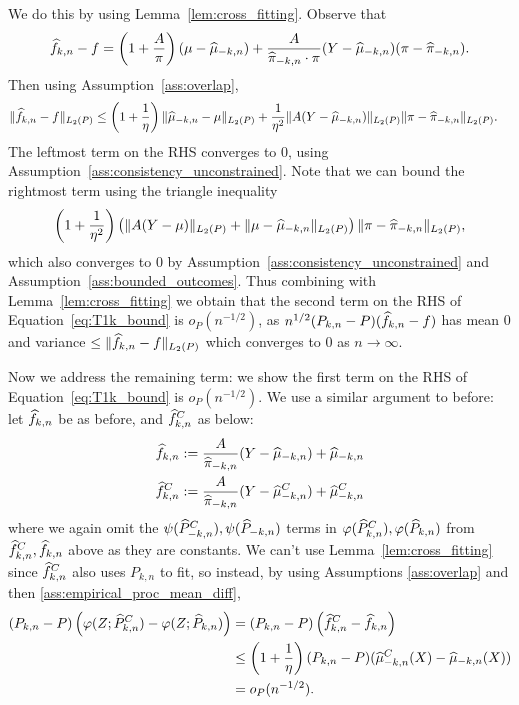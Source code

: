We do this by using Lemma~\ref{lem:cross_fitting}. 
Observe that
\begin{align}
\label{eq:second_term_t1}
    \widehat{f}_{k,n} - f =\left(1+\frac{A}{\pi}\right)(\mu-\widehat{\mu}_{-k,n})
    +\frac{A}{\widehat{\pi}_{-k,n}\cdot  \pi} (Y-\widehat{\mu}_{-k,n})(\pi-\widehat{\pi}_{-k,n}).
\end{align}
Then using Assumption~\ref{ass:overlap},
\begin{align}
\label{eq:T1_f_both}
    \|\widehat{f}_{k,n} - f\|_{L_2(P)}
    &\leq 
    \left(1+\frac{1}{\eta}\right) \|\widehat{\mu}_{-k,n}- \mu\|_{L_2(P)}
    +\frac{1}{\eta^2} \| A(Y-\widehat{\mu}_{-k,n})\|_{L_2(P)} \|\pi-\widehat{\pi}_{-k,n}\|_{L_2(P)}.
\end{align}
The leftmost term on the RHS converges to 0,  
using Assumption~\ref{ass:consistency_unconstrained}. 
Note that we can bound the rightmost term using the triangle inequality
\begin{align}
\label{eq:T1_f_second}
    \left(1+\frac{1}{\eta^2}\right) \left(\| A(Y-\mu)\|_{L_2(P)} +  \| \mu - \widehat{\mu}_{-k,n}\|_{L_2(P)} \right) \|\pi-\widehat{\pi}_{-k,n}\|_{L_2(P)},
\end{align}
which also converges to 0 by %
Assumption~\ref{ass:consistency_unconstrained}
and Assumption~\ref{ass:bounded_outcomes}. 
Thus combining with Lemma~\ref{lem:cross_fitting} we obtain that the second term on the RHS of Equation~\eqref{eq:T1k_bound} is $o_P(n^{-1/2})$,
as $n^{1/2}(P_{k,n}-P)( \widehat{f}_{k,n} - f)$ has mean 0 and variance $\leq \|\widehat{f}_{k,n} - f\|_{L_2(P)}$ which converges to 0 as $n\to\infty$.

Now we address the remaining term: we show the first term on the RHS of Equation~\eqref{eq:T1k_bound} is $o_P(n^{-1/2})$. We use a similar argument to before: 
let $\widehat{f}_{k,n}$ be as before, and $\widehat{f}^C_{k,n}$ as below:
\begin{align}
    \widehat{f}_{k,n} &:= \frac{A}{\widehat{\pi}_{-k,n}}(Y-\widehat{\mu}_{-k,n})+\widehat{\mu}_{-k,n}\\
    \widehat{f}^C_{k,n} &:= \frac{A}{\widehat{\pi}_{-k,n}}(Y-\widehat{\mu}_{-k,n}^C)+\widehat{\mu}_{-k,n}^C
\end{align}
where we again omit the $\psi(\widehat{P}^C_{-k,n}),\psi(\widehat{P}_{-k,n})$ terms in 
$\varphi(\widehat{P}_{k,n}^C),\varphi(\widehat{P}_{k,n})$
from $\widehat{f}^C_{k,n},\widehat{f}_{k,n}$ 
above as they are constants. 
We can't use Lemma~\ref{lem:cross_fitting}
since $\widehat{f}^C_{k,n}$ also uses $P_{k,n}$ to fit, so instead, by 
using Assumptions \ref{ass:overlap} and then \ref{ass:empirical_proc_mean_diff},
\begin{align}
    (P_{k,n}-P)
\left(\varphi(Z;\widehat{P}^C_{k,n})-\varphi(Z;\widehat{P}_{k,n})\right)
&=
(P_{k,n}-P)\left(\widehat{f}^C_{k,n}-\widehat{f}_{k,n}\right)
\\&\leq \left(1+\frac{1}{\eta}\right)(P_{k,n}-P)(\widehat{\mu}^C_{-k,n}(X)-\widehat{\mu}_{-k,n}(X))\\&=o_P(n^{-1/2}).
\end{align}


